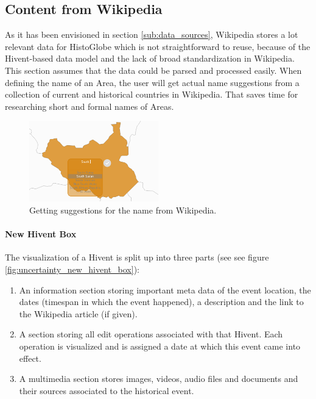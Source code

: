 
\subsection{Content from Wikipedia} %
\label{sub:content_from_wikipedia}

As it has been envisioned in section \ref{sub:data_sources}, Wikipedia stores a lot relevant data for HistoGlobe which is not straightforward to reuse, because of the Hivent-based data model and the lack of broad standardization in Wikipedia. This section assumes that the data could be parsed and processed easily. When defining the name of an Area, the user will get actual name suggestions from a collection of current and historical countries in Wikipedia. That saves time for researching short and formal names of Areas.

\begin{figure}[H]
  \centering
  \includegraphics[width=0.5\textwidth]{graphics/extensions/new_name_tool}
  \caption{Getting suggestions for the name from Wikipedia.}
  \label{fig:uncertainty_new_name_tool}
\end{figure}

\paragraph{New Hivent Box} %
\label{par:new_hivent_box}

The visualization of a Hivent is split up into three parts (see see figure \ref{fig:uncertainty_new_hivent_box}):

\begin{enumerate}
  \item An information section storing important meta data of the event location, the dates (timespan in which the event happened), a description and the link to the Wikipedia article (if given).
  \item A section storing all edit operations associated with that Hivent. Each operation is visualized and is assigned a date at which this event came into effect.
  \item A multimedia section stores images, videos, audio files and documents and their sources associated to the historical event.
\end{enumerate}

